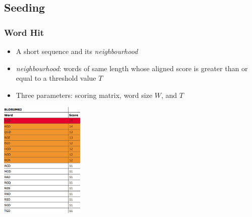 \documentclass[table]{beamer}
\begin{document}

  \subsection{Seeding}
  \begin{frame}
    \frametitle{Word Hit}
    \begin{itemize}
      \item A short sequence and its \emph{neighbourhood}
      \item \emph{neighbourhood}: words of same length whose aligned score is greater than or equal to a threshold value $T$
      \item Three parameters: scoring matrix, word size $W$, and $T$
    \end{itemize}
    \begin{center}
      \includegraphics[width=0.3\textwidth]{images/neighbourhood} 
    \end{center}    
  \end{frame}
\end{document}
